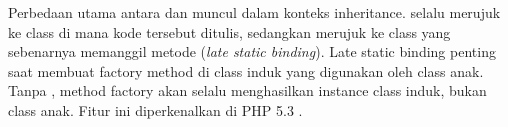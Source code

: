 Perbedaan utama antara  dan  muncul dalam konteks inheritance.  selalu merujuk ke class di mana kode tersebut ditulis, sedangkan  merujuk ke class yang sebenarnya memanggil metode (\textit{late static binding}). Late static binding penting saat membuat factory method di class induk yang digunakan oleh class anak. Tanpa , method factory akan selalu menghasilkan instance class induk, bukan class anak. Fitur ini diperkenalkan di PHP 5.3 \cite{phpManual}.

